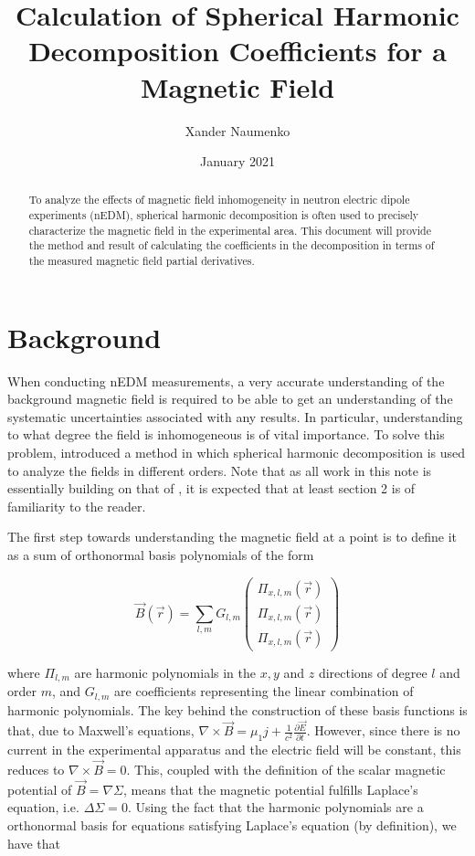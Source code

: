 \documentclass{article}
\title{Calculation of Spherical Harmonic Decomposition Coefficients for a Magnetic Field}
\author{Xander Naumenko }
\date{January 2021}
\begin{document}
\maketitle
\begin{abstract}
    To analyze the effects of magnetic field inhomogeneity in neutron electric dipole experiments (nEDM), spherical harmonic decomposition is often used to precisely characterize the magnetic field in the experimental area. This document will provide the method and result of calculating the coefficients in the decomposition in terms of the measured magnetic field partial derivatives. 
\end{abstract}

\section{Background}

When conducting nEDM measurements, a very accurate understanding of the background magnetic field is required to be able to get an understanding of the systematic uncertainties associated with any results. In particular, understanding to what degree the field is inhomogeneous is of vital importance. To solve this problem, \cite{non-uniformity} introduced a method in which spherical harmonic decomposition is used to analyze the fields in different orders. Note that as all work in this note is essentially building on that of \cite{non-uniformity}, it is expected that at least section 2 is of familiarity to the reader. 

The first step towards understanding the magnetic field at a point is to define it as a sum of orthonormal basis polynomials of the form

\begin{equation} \label{basis}
    \vec B(\vec r)=\sum_{l, m}G_{l, m}\begin{pmatrix}\Pi_{x, l, m}(\vec r)\\ \Pi_{x, l, m}(\vec r)\\ \Pi_{x, l, m}(\vec r)\end{pmatrix}
\end{equation}

where $\Pi_{l, m}$ are harmonic polynomials in the $x, y$ and $z$ directions of degree $l$ and order $m$, and $G_{l, m}$ are coefficients representing the linear combination of harmonic polynomials. The key behind the construction of these basis functions is that, due to Maxwell's equations, $\nabla\times \vec B=\mu_1j+\frac1{c^2}\frac{\partial \vec E}{\partial t}$. However, since there is no current in the experimental apparatus and the electric field will be constant, this reduces to $\nabla\times\vec B=0$. This, coupled with the definition of the scalar magnetic potential of $\vec B=\nabla \Sigma$, means that the magnetic potential fulfills Laplace's equation, i.e. $\Delta\Sigma=0$. Using the fact that the harmonic polynomials are a orthonormal basis for equations satisfying Laplace's equation (by definition), we have that 
\end{document}
